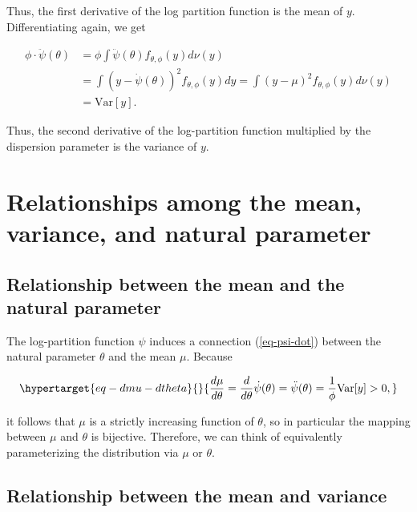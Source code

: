 \documentclass[
  11pt,
  letterpaper,
  oneside]{book}
\theoremstyle{plain}
\theoremstyle{plain}
\theoremstyle{definition}
\theoremstyle{definition}
\theoremstyle{plain}
\theoremstyle{remark}
\begin{document}
Thus, the first derivative of the log partition function is the mean of
\(y\). Differentiating again, we get

\[
\begin{split}
\phi \cdot \ddot \psi(\theta) &= \phi \int \ddot \psi(\theta) f_{\theta, \phi}(y) d\nu(y) \\
&= \int (y - \dot \psi(\theta))^2 f_{\theta, \phi}(y) dy = \int (y - \mu)^2f_{\theta, \phi}(y) d\nu(y) \\
&= \text{Var}[y].
\end{split}
\]

Thus, the second derivative of the log-partition function multiplied by
the dispersion parameter is the variance of \(y\).

\hypertarget{relationships-among-the-mean-variance-and-natural-parameter}{%
\section{Relationships among the mean, variance, and natural
parameter}\label{relationships-among-the-mean-variance-and-natural-parameter}}

\hypertarget{relationship-between-the-mean-and-the-natural-parameter}{%
\subsection{Relationship between the mean and the natural
parameter}\label{relationship-between-the-mean-and-the-natural-parameter}}

The log-partition function \(\psi\) induces a connection
(\ref{eq-psi-dot}) between the natural parameter \(\theta\) and the mean
\(\mu\). Because

\begin{equation}\protect\hypertarget{eq-dmu-dtheta}{}{
\frac{d\mu}{d\theta} = \frac{d}{d\theta}\dot \psi(\theta) = \ddot \psi(\theta) = \frac{1}{\phi}\text{Var}[y] > 0,
}\label{eq-dmu-dtheta}\end{equation}

it follows that \(\mu\) is a strictly increasing function of \(\theta\),
so in particular the mapping between \(\mu\) and \(\theta\) is
bijective. Therefore, we can think of equivalently parameterizing the
distribution via \(\mu\) or \(\theta\).

\hypertarget{relationship-between-the-mean-and-variance}{%
\subsection{Relationship between the mean and
variance}\label{relationship-between-the-mean-and-variance}}
\end{document}
